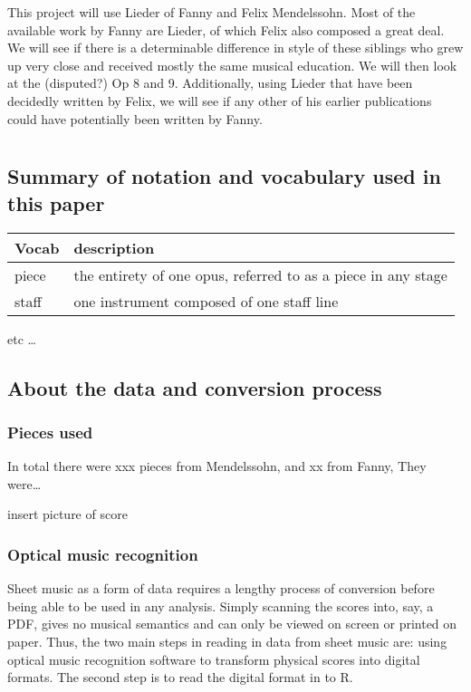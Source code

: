 \documentclass[12pt,twoside]{reedthesis}
\theoremstyle{definition}
\theoremstyle{definition}
\theoremstyle{definition}
\theoremstyle{remark}
\begin{document}
This project will use Lieder of Fanny and Felix Mendelssohn. Most of the
available work by Fanny are Lieder, of which Felix also composed a great
deal. We will see if there is a determinable difference in style of
these siblings who grew up very close and received mostly the same
musical education. We will then look at the (disputed?) Op 8 and 9.
Additionally, using Lieder that have been decidedly written by Felix, we
will see if any other of his earlier publications could have potentially
been written by Fanny.

\chapter{}\label{section-1}

\section{Summary of notation and vocabulary used in this
paper}\label{summary-of-notation-and-vocabulary-used-in-this-paper}
\begin{longtable}[]{@{}ll@{}}
\toprule
Vocab & description\tabularnewline
\midrule
\endhead
piece & the entirety of one opus, referred to as a piece in any
stage\tabularnewline
staff & one instrument composed of one staff line\tabularnewline
\bottomrule
\end{longtable}
etc \ldots{}

\section{About the data and conversion
process}\label{about-the-data-and-conversion-process}

\subsection{Pieces used}\label{pieces-used}

In total there were xxx pieces from Mendelssohn, and xx from Fanny, They
were\ldots{}

insert picture of score

\subsection{Optical music recognition}\label{optical-music-recognition}

Sheet music as a form of data requires a lengthy process of conversion
before being able to be used in any analysis. Simply scanning the scores
into, say, a PDF, gives no musical semantics and can only be viewed on
screen or printed on paper. Thus, the two main steps in reading in data
from sheet music are: using optical music recognition software to
transform physical scores into digital formats. The second step is to
read the digital format in to R.
\end{document}
